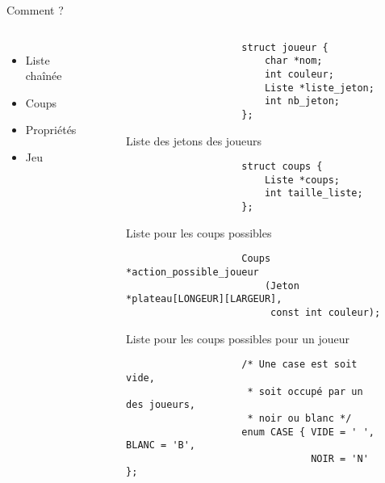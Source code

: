 \documentclass{beamer}
\begin{document}
\begin{frame}[fragile]{Comment ?}
    \begin{columns}[onlytextwidth]
        \def\rcolumn{63mm} %
        \column{\linewidth-\rcolumn-1mm} %
        \begin{itemize}
            \item Liste chaînée
            \item<3-> Coups
            \item<4-> Propriétés
            \item<5-> Jeu
        \end{itemize}
        \column{\rcolumn} %
        \begin{overprint}
            \begin{figure}
                \vspace{25mm}
                \begin{verbatim}
                    struct joueur {
                        char *nom;
                        int couleur;
                        Liste *liste_jeton;
                        int nb_jeton;
                    };
                \end{verbatim}
                \caption*{Liste des jetons des joueurs}
            \end{figure}
            \begin{figure}
                \vspace{27mm}
                \begin{verbatim}
                    struct coups {
                        Liste *coups;
                        int taille_liste;
                    };
                \end{verbatim}
                \caption*{Liste pour les coups possibles}
            \end{figure}
            \begin{figure}
                \vspace{27mm}
                \begin{verbatim}
                    Coups *action_possible_joueur
                        (Jeton *plateau[LONGEUR][LARGEUR],
                         const int couleur);
                \end{verbatim}
                \caption*{Liste pour les coups possibles pour un joueur}
            \end{figure}
            \begin{figure}
                \vspace{20mm}
                \begin{verbatim}
                    /* Une case est soit vide,
                     * soit occupé par un des joueurs,
                     * noir ou blanc */
                    enum CASE { VIDE = ' ', BLANC = 'B',
                                NOIR = 'N' };


\end{verbatim}
\end{figure}
\end{overprint}
\end{columns}
\end{frame}
\end{document}
